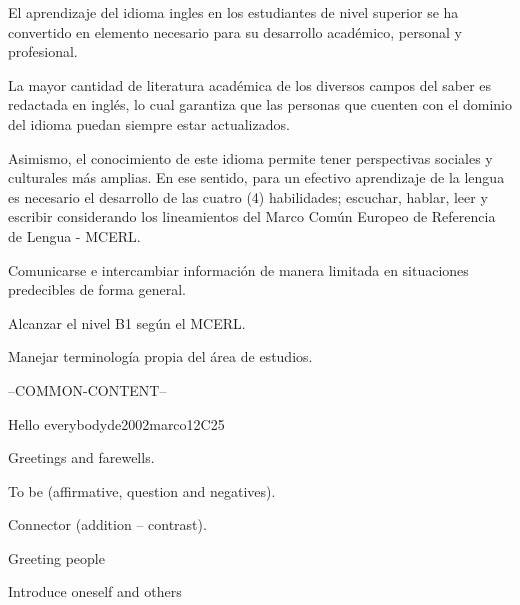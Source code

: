 \begin{syllabus}


\begin{justification}
El aprendizaje del idioma ingles en los estudiantes de nivel superior se ha 
convertido en elemento necesario para su desarrollo académico, personal y 
profesional. 

La mayor cantidad de literatura académica de los diversos campos del 
saber es redactada en inglés, lo cual garantiza que las personas que cuenten 
con el dominio del idioma puedan siempre estar actualizados. 

Asimismo, el conocimiento de este idioma permite tener perspectivas 
sociales y culturales más amplias. En ese sentido, para un efectivo 
aprendizaje de la lengua es necesario el desarrollo de 
las cuatro (4) habilidades; escuchar, hablar, leer y escribir 
considerando los lineamientos del 
Marco Común Europeo de Referencia de Lengua - MCERL.
\end{justification}

\begin{goals}
\item Comunicarse e intercambiar información de manera limitada en situaciones predecibles de forma general.
\item Alcanzar el nivel B1 según el MCERL.
\item Manejar terminología propia del área de estudios.
\end{goals}

--COMMON-CONTENT--

\begin{unit}{Hello everybody}{}{de2002marco}{12}{C25}
   \begin{topics}
      \item Greetings and farewells.
      \item To be (affirmative, question and negatives).
      \item Connector (addition – contrast).
   \end{topics}

   \begin{learningoutcomes}
      \item Greeting people
      \item Introduce oneself and others
   \end{learningoutcomes}
\end{unit}


\end{syllabus}

